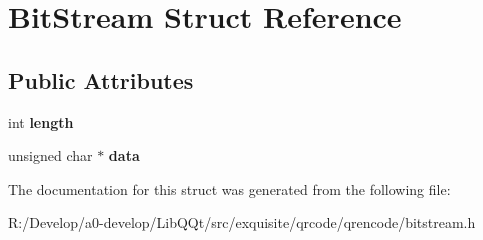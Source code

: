 \hypertarget{struct_bit_stream}{}\section{Bit\+Stream Struct Reference}
\label{struct_bit_stream}
\subsection*{Public Attributes}
\begin{DoxyCompactItemize}
\item 
\mbox{\label{struct_bit_stream_a9d7bbee2d63720a8ee8e0f427ae8afe2}} 
int {\bfseries length}
\item 
\mbox{\label{struct_bit_stream_ad56e6ae32cf87078cbca2eed5536ba2d}} 
unsigned char $\ast$ {\bfseries data}
\end{DoxyCompactItemize}


The documentation for this struct was generated from the following file\+:\begin{DoxyCompactItemize}
\item 
R\+:/\+Develop/a0-\/develop/\+Lib\+Q\+Qt/src/exquisite/qrcode/qrencode/bitstream.\+h\end{DoxyCompactItemize}
